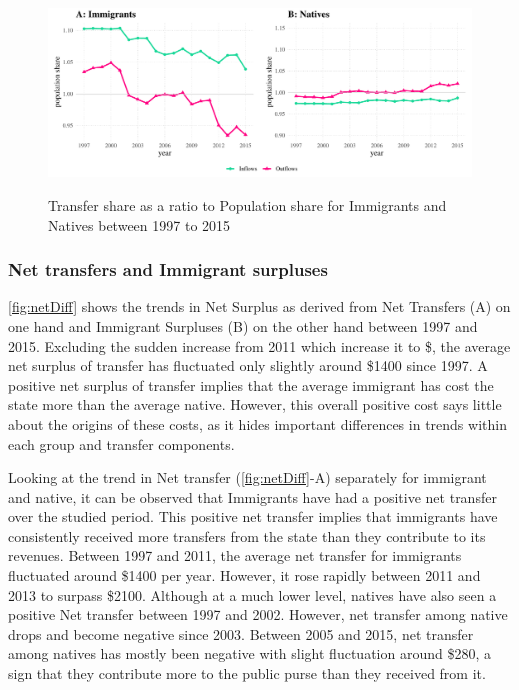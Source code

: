   \begin{figure}[H]%
    \caption{Transfer share as a ratio to Population share for Immigrants and Natives between 1997 to 2015}
    \includegraphics[width=1\textwidth]{res/aggTrend.pdf}%
    \label{fig:aggTrend}%
  \end{figure}%

  \subsubsection*{Net transfers and Immigrant surpluses}

  \autoref{fig:netDiff} shows the trends in Net Surplus as derived from Net Transfers (A) on one hand and Immigrant Surpluses (B) on the other hand between 1997 and 2015.
Excluding the sudden increase from 2011 which increase it to \$, the average net surplus of transfer has fluctuated only slightly around \$1400 since 1997.
A positive net surplus of transfer implies that the average immigrant has cost the state more than the average native.
However, this overall positive cost says little about the origins of these costs, as it hides important differences in trends within each group and transfer components.

  \vspace{0.7em}\par
  Looking at the trend in Net transfer (\autoref{fig:netDiff}-A) separately for immigrant and native, it can be observed that Immigrants have had a positive net transfer over the studied period.
This positive net transfer implies that immigrants have consistently received more transfers from the state than they contribute to its revenues.
Between 1997 and 2011, the average net transfer for immigrants fluctuated around \$1400 per year.
However, it rose rapidly between 2011 and 2013 to surpass \$2100.
Although at a much lower level, natives have also seen a positive Net transfer between 1997 and 2002.
However, net transfer among native drops and become negative since 2003.
Between 2005 and 2015, net transfer among natives has mostly been negative with slight fluctuation around \$280, a sign that they contribute more to the public purse than they received from it.

